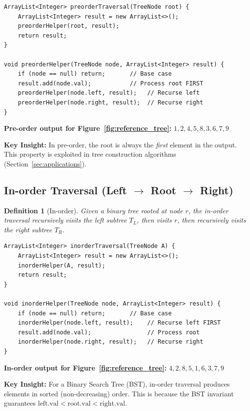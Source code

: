 \documentclass[10pt,journal,compsoc,onecolumn]{IEEEtran}
\newtheorem{definition}[theorem]{Definition}
\begin{document}
\begin{verbatim}
ArrayList<Integer> preorderTraversal(TreeNode root) {
    ArrayList<Integer> result = new ArrayList<>();
    preorderHelper(root, result);
    return result;
}

void preorderHelper(TreeNode node, ArrayList<Integer> result) {
    if (node == null) return;       // Base case
    result.add(node.val);           // Process root FIRST
    preorderHelper(node.left, result);   // Recurse left
    preorderHelper(node.right, result);  // Recurse right
}
\end{verbatim}

\textbf{Pre-order output for Figure~\ref{fig:reference_tree}:} $1, 2, 4, 5, 8, 3, 6, 7, 9$

\textbf{Key Insight:} In pre-order, the root is always the \emph{first} element in the output. This property is exploited in tree construction algorithms (Section~\ref{sec:applications}).

\subsection{In-order Traversal (Left $\to$ Root $\to$ Right)}

\begin{definition}[In-order]
Given a binary tree rooted at node $r$, the in-order traversal recursively visits the left subtree $T_L$, then visits $r$, then recursively visits the right subtree $T_R$.
\end{definition}

\begin{verbatim}
ArrayList<Integer> inorderTraversal(TreeNode A) {
    ArrayList<Integer> result = new ArrayList<>();
    inorderHelper(A, result);
    return result;
}

void inorderHelper(TreeNode node, ArrayList<Integer> result) {
    if (node == null) return;       // Base case
    inorderHelper(node.left, result);    // Recurse left FIRST
    result.add(node.val);                // Process root
    inorderHelper(node.right, result);   // Recurse right
}
\end{verbatim}

\textbf{In-order output for Figure~\ref{fig:reference_tree}:} $4, 2, 8, 5, 1, 6, 3, 7, 9$

\textbf{Key Insight:} For a Binary Search Tree (BST), in-order traversal produces elements in sorted (non-decreasing) order. This is because the BST invariant guarantees $\mathrm{left.val} < \mathrm{root.val} < \mathrm{right.val}$.
\end{document}
